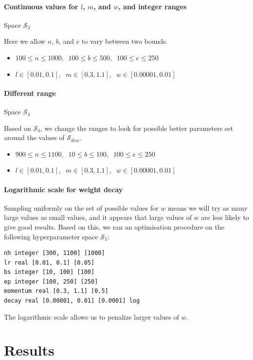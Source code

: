 \documentclass[10pt,a4paper, twocolumn]{article}
\theoremstyle{definition}
\begin{document}
\paragraph{Continuous values for $l$, $m$, and $w$, and integer ranges} Space $\mathcal{S}_3$

Here we allow $n$, $b$, and $e$ to vary between two bounds.
\begin{itemize}
\item $100 \leq n \leq 1000, \; \; 100 \leq b \leq 500, \; \; 100 \leq e \leq 250$
\item $l \in [0.01, 0.1], \; \; m \in [0.3, 1.1], \; \; w \in [0.00001, 0.01]$
\end{itemize}

\paragraph{Different range} Space $\mathcal{S}_4$

Based on $\mathcal{S}_3$, we change the ranges to look for possible better parameters set around the values of $\mathcal{S}_{disc}$.

\begin{itemize}
\item $900 \leq n \leq 1100, \; \; 10 \leq b \leq 100, \; \; 100 \leq e \leq 250$
\item $l \in [0.01, 0.1], \; \; m \in [0.3, 1.1], \; \; w \in [0.00001, 0.01]$
\end{itemize}

\paragraph{Logarithmic scale for weight decay}

Sampling uniformly on the set of possible values for $w$ means we will try as many large values as small values, and it appears that large values of $w$ are less likely to give good results. Based on this, we ran an optimisation procedure on the following hyperparameter space $\mathcal{S}_5$:
\begin{verbatim}
nh integer [300, 1100] [1000]
lr real [0.01, 0.1] [0.05]
bs integer [10, 100] [100]
ep integer [100, 250] [250]
momentum real [0.3, 1.1] [0.5]
decay real [0.00001, 0.01] [0.0001] log
\end{verbatim}

The logarithmic scale allows us to penalize larger values of $w$.

\section{Results}
\end{document}
